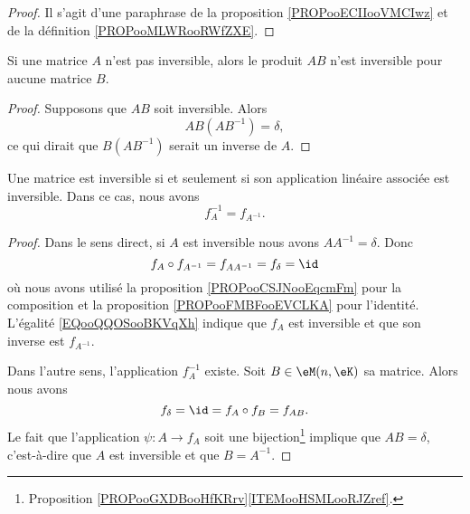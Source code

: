\begin{proof}
    Il s'agit d'une paraphrase de la proposition \ref{PROPooECIIooVMCIwz} et de la définition \ref{PROPooMLWRooRWfZXE}.
\end{proof}

\begin{lemma}       \label{LEMooZDNVooArIXzC}
    Si une matrice \( A\) n'est pas inversible, alors le produit \( AB\) n'est inversible pour aucune matrice \( B\).
\end{lemma}

\begin{proof}
    Supposons que \( AB\) soit inversible. Alors
    \begin{equation}
        AB(AB^{-1})=\delta,
    \end{equation}
    ce qui dirait que \( B(AB^{-1})\) serait un inverse de \( A\).
\end{proof}

\begin{proposition}     \label{PROPooNPMCooPmaCwu}
    Une matrice est inversible si et seulement si son application linéaire associée est inversible. Dans ce cas, nous avons
    \begin{equation}
        f_A^{-1}=f_{A^{-1}}.
    \end{equation}
\end{proposition}

\begin{proof}
    Dans le sens direct, si \( A\) est inversible nous avons \( AA^{-1}=\delta\). Donc
    \begin{equation}        \label{EQooQQOSooBKVqXh}
        f_A\circ f_{A^{-1}}=f_{AA^{-1}}=f_{\delta}=\id
    \end{equation}
    où nous avons utilisé la proposition \ref{PROPooCSJNooEqcmFm} pour la composition et la proposition \ref{PROPooFMBFooEVCLKA} pour l'identité. L'égalité \eqref{EQooQQOSooBKVqXh} indique que \( f_A\) est inversible et que son inverse est \( f_{A^{-1}}\).

    Dans l'autre sens, l'application \( f_A^{-1}\) existe. Soit \( B\in \eM(n,\eK)\) sa matrice. Alors nous avons
    \begin{equation}
        f_{\delta}=\id=f_A\circ f_B=f_{AB}.
    \end{equation}
    Le fait que l'application \(\psi\colon A\to f_A\) soit une bijection\footnote{Proposition \ref{PROPooGXDBooHfKRrv}\ref{ITEMooHSMLooRJZref}.} implique que \( AB=\delta\), c'est-à-dire que \( A\) est inversible et que \( B=A^{-1}\).
\end{proof}

